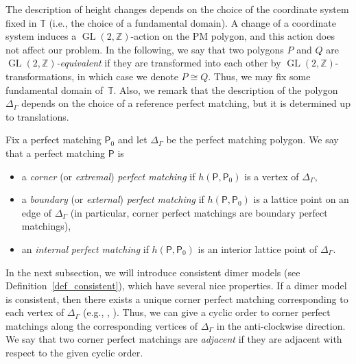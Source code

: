 \documentclass[11pt]{article}
\numberwithin{equation}{section}
\numberwithin{equation}{section}
\numberwithin{figure}{section}
\numberwithin{table}{section}
\newcommand{\ZZ}{\mathbb{Z}}
\newcommand{\TT}{\mathbb{T}}
\newcommand{\sfP}{\mathsf{P}}
\newcommand{\GL}{\operatorname{GL}}
\begin{document}
\begin{Remark}\label{rem_polygon}
The description of height changes depends on the choice of the coordinate system fixed in $\TT$
(i.e., the choice of a fundamental domain).
A change of a coordinate system induces a $\GL(2,\ZZ)$-action on the PM polygon, and this action does not affect our problem.
In the following, we say that two polygons $P$ and $Q$ are \emph{$\GL(2,\ZZ)$-equivalent} if they are transformed into each other by $\GL(2,\ZZ)$-transformations, in which case we denote $P\cong Q$.
Thus, we may fix some fundamental domain of~$\TT$.
Also, we remark that the description of the polygon $\Delta_\Gamma$ depends on the choice of a reference perfect matching, but it is determined up to translations.
\end{Remark}

\begin{Definition}\label{def_corner}
Fix a perfect matching $\sfP_0$ and let $\Delta_\Gamma$ be the perfect matching polygon.
We say that a perfect matching $\sfP$ is
\begin{itemize}\itemsep=0pt
\item a \emph{corner} (or \emph{extremal}) \emph{perfect matching} if $h(\sfP,\sfP_0)$ is a vertex of $\Delta_\Gamma$,
\item a \emph{boundary} (or \emph{external}) \emph{perfect matching} if $h(\sfP,\sfP_0)$ is a lattice point on an edge of $\Delta_\Gamma$
(in particular, corner perfect matchings are boundary perfect matchings),
\item an \emph{internal} \emph{perfect matching} if $h(\sfP,\sfP_0)$ is an interior lattice point of $\Delta_\Gamma$.
\end{itemize}
\end{Definition}

In the next subsection, we will introduce consistent dimer models (see Definition~\ref{def_consistent}), which have several nice properties.
If a dimer model is consistent, then there exists a unique corner perfect matching corresponding to each vertex of $\Delta_\Gamma$
(e.g., \cite[Corollary~4.27]{Bro}, \cite[Proposition~9.2]{IU2}).
Thus, we can give a cyclic order to corner perfect matchings along the corresponding vertices of $\Delta_\Gamma$ in the anti-clockwise direction.
We say that two corner perfect matchings are \emph{adjacent} if they are adjacent with respect to the given cyclic order.
\end{document}
